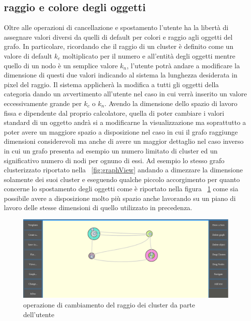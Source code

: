 {\subsection{raggio e colore degli oggetti}
Oltre alle operazioni di cancellazione e spostamento l'utente ha la libertà di assegnare valori diversi da quelli di default per colori e raggio agli oggetti del grafo. In particolare, ricordando che il raggio di un cluster è definito come un valore di default $k_c$ moltiplicato per il numero e all'entità degli oggetti mentre quello di un nodo è un semplice valore $k_n$, l'utente potrà andare a modificare la dimensione di questi due valori indicando al sistema la lunghezza desiderata in pixel del raggio. Il sistema applicherà la modifica a tutti gli oggetti della categoria dando un avvertimento all'utente nel caso in cui verrà inserito un valore eccessivamente grande per $k_c$ o $k_n$. Avendo la dimensione dello spazio di lavoro fissa e dipendente dal proprio calcolatore, quella di poter cambiare i valori standard di un oggetto andrà si a modificarne la visualizzazione ma soprattutto a poter avere un maggiore spazio a disposizione nel caso in cui il grafo raggiunge dimensioni considerevoli ma anche di avere un maggior dettaglio nel caso inverso in cui un grafo presenta ad esempio un numero limitato di cluster ed un significativo numero di nodi per ognuno di essi. Ad esempio lo stesso grafo clusterizzato riportato nella \figurename~\ref{fig:graphView} andando a dimezzare la dimensione solamente dei suoi cluster e eseguendo qualche piccolo accorgimento per quanto concerne lo spostamento degli oggetti come è riportato nella figura \figurename~\ref{fig:changeRad} come sia possibile avere a disposizione molto più spazio anche lavorando su un piano di lavoro delle stesse dimensioni di quello utilizzato in precedenza.
\begin{figure}[!htb]
	\begin{center}
		\includegraphics[width=0.8 \linewidth]{figure/changeRad}
	\end{center}
	\caption{operazione di cambiamento del raggio dei cluster da parte dell'utente\label{fig:changeRad}}

\end{figure}}
